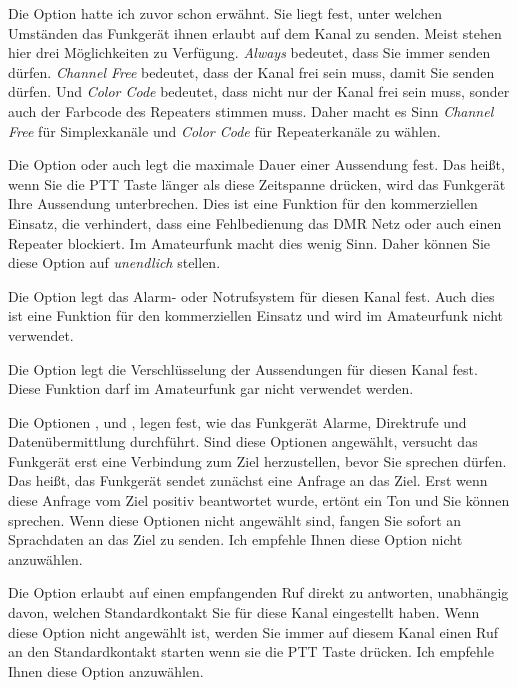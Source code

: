 Die  Option hatte ich zuvor schon erwähnt. Sie liegt fest, unter welchen Umständen das Funkgerät ihnen erlaubt auf dem Kanal zu senden. Meist stehen hier drei Möglichkeiten zu Verfügung. \emph{Always} bedeutet, dass Sie immer senden dürfen. \emph{Channel Free} bedeutet, dass der Kanal frei sein muss, damit Sie senden dürfen. Und \emph{Color Code} bedeutet, dass nicht nur der Kanal frei sein muss, sonder auch der Farbcode des Repeaters stimmen muss. Daher macht es Sinn \emph{Channel Free} für Simplexkanäle und \emph{Color Code} für Repeaterkanäle zu wählen.

Die Option  oder auch  legt die maximale Dauer einer Aussendung fest. Das heißt, wenn Sie die PTT Taste länger als diese Zeitspanne drücken, wird das Funkgerät Ihre Aussendung unterbrechen. Dies ist eine Funktion für den kommerziellen Einsatz, die verhindert, dass eine Fehlbedienung das DMR Netz oder auch einen Repeater blockiert. Im Amateurfunk macht dies wenig Sinn. Daher können Sie diese Option auf \emph{unendlich} stellen.

Die Option  legt das Alarm- oder Notrufsystem für diesen Kanal fest. Auch dies ist eine Funktion für den kommerziellen Einsatz und wird im Amateurfunk nicht verwendet.

Die Option  legt die Verschlüsselung der Aussendungen für diesen Kanal fest. Diese Funktion darf im Amateurfunk gar nicht verwendet werden.

Die Optionen ,  und , legen fest, wie das Funkgerät Alarme, Direktrufe und Datenübermittlung durchführt. Sind diese Optionen angewählt, versucht das Funkgerät erst eine Verbindung zum Ziel herzustellen, bevor Sie sprechen dürfen. Das heißt, das Funkgerät sendet zunächst eine Anfrage an das Ziel. Erst wenn diese Anfrage vom Ziel positiv beantwortet wurde, ertönt ein Ton und Sie können sprechen. Wenn diese Optionen nicht angewählt sind, fangen Sie sofort an Sprachdaten an das Ziel zu senden. Ich empfehle Ihnen diese Option nicht anzuwählen.

Die Option  erlaubt auf einen empfangenden Ruf direkt zu antworten, unabhängig davon, welchen Standardkontakt Sie für diese Kanal eingestellt haben. Wenn diese Option nicht angewählt ist, werden Sie immer auf diesem Kanal einen Ruf an den Standardkontakt starten wenn sie die PTT Taste drücken. Ich empfehle Ihnen diese Option anzuwählen.

